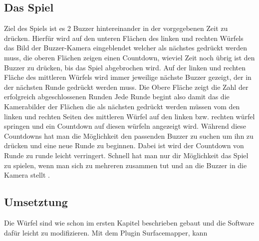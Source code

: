 \documentclass[pdftex,12pt,a4paper]{report}
\begin{document}
\subsection{Das Spiel}
Ziel des Spiels ist es 2 Buzzer hintereinander in der vorgegebenen Zeit zu drücken. Hierfür wird auf den unteren Flächen des linken und rechten Würfels das Bild der Buzzer-Kamera eingeblendet welcher als nächstes gedrückt werden muss, die oberen Flächen zeigen einen Countdown, wieviel Zeit noch übrig ist den Buzzer zu drücken, bis das Spiel abgebrochen wird.  Auf der linken und rechten Fläche des mittleren Würfels wird immer jeweilige nächste Buzzer gezeigt, der in der nächsten Runde gedrückt werden muss. Die Obere Fläche zeigt die Zahl der erfolgreich abgeschlossenen Runden
Jede Runde begint also damit das die Kamerabilder der Flächen die als nächsten gedrückt werden müssen vom den linken und rechten Seiten des mittleren Würfel auf den linken bzw. rechten würfel springen und ein Countdown auf diesen würfeln angezeigt wird. Während diese Countdowns hat man die Möglichkeit den passenden Buzzer zu suchen um ihn zu drücken und eine neue Runde zu beginnen. Dabei ist wird der Countdown von Runde zu runde leicht verringert. Schnell hat man nur dir Möglichkeit das Spiel zu spielen, wenn man sich zu mehreren zusammen tut und an die Buzzer in die Kamera stellt  .

\subsection{Umsetztung}
Die Würfel sind wie schon im ersten Kapitel beschrieben gebaut und die Software dafür leicht zu modifizieren. Mit dem Plugin Surfacemapper, kann 
\end{document}

